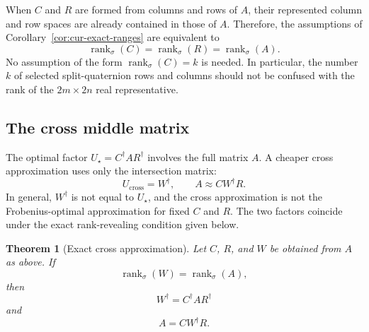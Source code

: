 \documentclass[12pt,a4paper]{article}
\theoremstyle{plain}
\newtheorem{theorem}{Theorem}[section]
\theoremstyle{definition}
\theoremstyle{remark}
\begin{document}
When \(C\) and \(R\) are formed from columns and rows of \(A\), their represented column and row spaces are already contained in those of \(A\). Therefore, the assumptions of Corollary~\ref{cor:cur-exact-ranges} are equivalent to
\[
    \operatorname{rank}_{\sigma}(C) = \operatorname{rank}_{\sigma}(R) = \operatorname{rank}_{\sigma}(A).
\]
No assumption of the form \(\operatorname{rank}_{\sigma}(C)=k\) is needed.  In particular, the number \(k\) of selected split-quaternion rows and columns should not be confused with the rank of the \(2m\times 2n\) real representative.

\subsection{The cross middle matrix}

The optimal factor \(U_\star=C^\dagger A R^\dagger\) involves the full matrix \(A\).  A cheaper cross approximation uses only the intersection matrix:
\[
    U_{\mathrm{cross}}=W^\dagger, \qquad A\approx C W^\dagger R.
\]
In general, \(W^\dagger\) is not equal to \(U_\star\), and the cross approximation is not the Frobenius-optimal approximation for fixed \(C\) and \(R\).  The two factors coincide under the exact rank-revealing condition given below.

\begin{theorem}[Exact cross approximation]
\label{thm:exact-cross}
Let \(C\), \(R\), and \(W\) be obtained from \(A\) as above.  If
\[
    \operatorname{rank}_{\sigma}(W) = \operatorname{rank}_{\sigma}(A),
\]
then
\[
    W^\dagger=C^\dagger A R^\dagger
\]
and
\[
    A=CW^\dagger R.
\]
\end{theorem}
\end{document}
